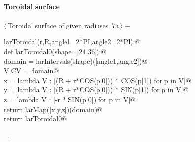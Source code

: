 \documentclass[11pt,oneside]{article}	%
\begin{document}
\paragraph{Toroidal surface}
\begin{flushleft} \small \label{scrap11}
\protect{}$\langle\,$Toroidal surface of given radiuses\nobreak\ {\footnotesize 7a}$\,\rangle\equiv$
\vspace{-1ex}
\begin{list}{}{} \item
\mbox{}\verb@def larToroidal(r,R,angle1=2*PI,angle2=2*PI):@\\
\mbox{}\verb@   def larToroidal0(shape=[24,36]):@\\
\mbox{}\verb@      domain = larIntervals(shape)([angle1,angle2])@\\
\mbox{}\verb@      V,CV = domain@\\
\mbox{}\verb@      x = lambda V : [(R + r*COS(p[0])) * COS(p[1]) for p in V]@\\
\mbox{}\verb@      y = lambda V : [(R + r*COS(p[0])) * SIN(p[1]) for p in V]@\\
\mbox{}\verb@      z = lambda V : [-r * SIN(p[0]) for p in V]@\\
\mbox{}\verb@      return larMap([x,y,z])(domain)@\\
\mbox{}\verb@   return larToroidal0@\\
\mbox{}\verb@@{\NWsep}
\end{list}
\vspace{-1ex}
\footnotesize\addtolength{\baselineskip}{-1ex}
\begin{list}{}{\setlength{\itemsep}{-\parsep}\setlength{\itemindent}{-\leftmargin}}
\item \NWtxtMacroRefIn\ .
\end{list}
\end{flushleft}
\end{document}
